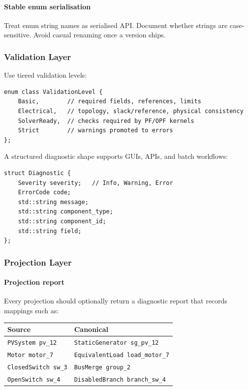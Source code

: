 \paragraph{Stable enum serialisation}
Treat enum string names as serialised API.  Document whether strings are
case-sensitive.  Avoid casual renaming once a version ships.

\subsubsection{Validation Layer}

Use tiered validation levels:

\begin{verbatim}
enum class ValidationLevel {
    Basic,        // required fields, references, limits
    Electrical,   // topology, slack/reference, physical consistency
    SolverReady,  // checks required by PF/OPF kernels
    Strict        // warnings promoted to errors
};
\end{verbatim}

A structured diagnostic shape supports GUIs, APIs, and batch workflows:

\begin{verbatim}
struct Diagnostic {
    Severity severity;   // Info, Warning, Error
    ErrorCode code;
    std::string message;
    std::string component_type;
    std::string component_id;
    std::string field;
};
\end{verbatim}

\subsubsection{Projection Layer}

\paragraph{Projection report}
Every projection should optionally return a diagnostic report that records
mappings such as:
\begin{center}
\begin{tabular}{ll}
\hline\hline
\textbf{Source} & \textbf{Canonical} \\
\hline
\texttt{PVSystem pv\_12} & \texttt{StaticGenerator sg\_pv\_12} \\
\texttt{Motor motor\_7} & \texttt{EquivalentLoad load\_motor\_7} \\
\texttt{ClosedSwitch sw\_3} & \texttt{BusMerge group\_2} \\
\texttt{OpenSwitch sw\_4} & \texttt{DisabledBranch branch\_sw\_4} \\
\hline\hline
\end{tabular}
\end{center}

